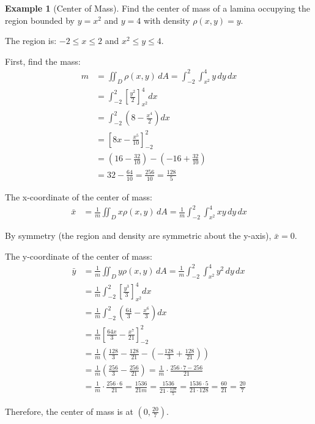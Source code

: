 \documentclass[12pt,a4paper]{book}
\theoremstyle{definition}
\newtheorem{example}{Example}[chapter]
\begin{document}
\begin{example}[Center of Mass]
Find the center of mass of a lamina occupying the region bounded by $y = x^2$ and $y = 4$ with density $\rho(x,y) = y$.

The region is: $-2 \leq x \leq 2$ and $x^2 \leq y \leq 4$.

First, find the mass:
\begin{align}
m &= \iint_D \rho(x,y) \, dA = \int_{-2}^2 \int_{x^2}^4 y \, dy \, dx\\
&= \int_{-2}^2 \left[ \frac{y^2}{2} \right]_{x^2}^4 dx\\
&= \int_{-2}^2 \left( 8 - \frac{x^4}{2} \right) dx\\
&= \left[ 8x - \frac{x^5}{10} \right]_{-2}^2\\
&= \left( 16 - \frac{32}{10} \right) - \left( -16 + \frac{32}{10} \right)\\
&= 32 - \frac{64}{10} = \frac{256}{10} = \frac{128}{5}
\end{align}

The x-coordinate of the center of mass:
\begin{align}
\bar{x} &= \frac{1}{m} \iint_D x\rho(x,y) \, dA = \frac{1}{m} \int_{-2}^2 \int_{x^2}^4 xy \, dy \, dx
\end{align}

By symmetry (the region and density are symmetric about the y-axis), $\bar{x} = 0$.

The y-coordinate of the center of mass:
\begin{align}
\bar{y} &= \frac{1}{m} \iint_D y\rho(x,y) \, dA = \frac{1}{m} \int_{-2}^2 \int_{x^2}^4 y^2 \, dy \, dx\\
&= \frac{1}{m} \int_{-2}^2 \left[ \frac{y^3}{3} \right]_{x^2}^4 dx\\
&= \frac{1}{m} \int_{-2}^2 \left( \frac{64}{3} - \frac{x^6}{3} \right) dx\\
&= \frac{1}{m} \left[ \frac{64x}{3} - \frac{x^7}{21} \right]_{-2}^2\\
&= \frac{1}{m} \left( \frac{128}{3} - \frac{128}{21} - \left( -\frac{128}{3} + \frac{128}{21} \right) \right)\\
&= \frac{1}{m} \left( \frac{256}{3} - \frac{256}{21} \right) = \frac{1}{m} \cdot \frac{256 \cdot 7 - 256}{21}\\
&= \frac{1}{m} \cdot \frac{256 \cdot 6}{21} = \frac{1536}{21m} = \frac{1536}{21 \cdot \frac{128}{5}} = \frac{1536 \cdot 5}{21 \cdot 128} = \frac{60}{21} = \frac{20}{7}
\end{align}

Therefore, the center of mass is at $\left( 0, \frac{20}{7} \right)$.
\end{example}
\end{document}
